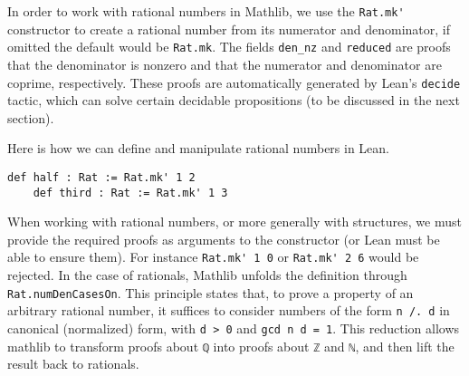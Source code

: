 In order to work with rational numbers in Mathlib, we use the
\lstinline[language=lean]|Rat.mk'| constructor to create a rational number from
its numerator and denominator, if omitted the default would be \lstinline[language=lean]|Rat.mk|.
The fields \lstinline[language=lean]|den_nz| and \lstinline[language=lean]|reduced| are proofs that
the denominator is nonzero and that the numerator and denominator are coprime, respectively.
These proofs are automatically generated by Lean's \lstinline[language=lean]|decide| tactic, which can
solve certain decidable propositions (to be discussed in the next section).
\begin{example}
  Here is how we can define and manipulate rational numbers in Lean.
  \begin{lstlisting}[language=lean]
    def half : Rat := Rat.mk' 1 2
    def third : Rat := Rat.mk' 1 3
  \end{lstlisting}
\end{example}
When working with rational numbers, or more generally with structures, we must provide the
required proofs as arguments to the constructor (or Lean must be able to ensure them).
For instance \lstinline[language=lean]|Rat.mk' 1 0| or \lstinline[language=lean]|Rat.mk' 2 6|
would be rejected.
In the case of rationals, Mathlib unfolds the definition through
\lstinline[language=lean]|Rat.numDenCasesOn|. This principle states that, to prove a property of an
arbitrary rational number, it suffices to consider numbers of the form \lstinline[language=lean]|n /. d|
in canonical (normalized) form, with \lstinline[language=lean]|d > 0| and \lstinline[language=lean]|gcd n d = 1|.
This reduction allows mathlib to transform proofs about \lstinline[language=lean]|ℚ|
into proofs about \lstinline[language=lean]|ℤ| and \lstinline[language=lean]|ℕ|,
and then lift the result back to rationals.
